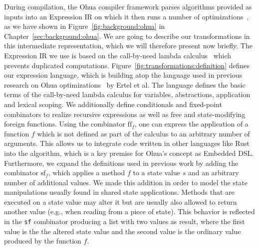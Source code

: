 During compilation, the Ohua compiler framework parses algorithms provided as inputs into an Expression IR on which it then runs a number of optimizations~\cite{ertel2018compiling}, as we have shown in Figure~\ref{fig:background:ohua} in Chapter~\ref{sec:background:ohua}.
We are going to describe our transformations in this intermediate representation, which we will therefore present now briefly.
The Expression IR we use is based on the call-by-need lambda calculus~\cite{ariola1997lambda, ariola1995lambda} which prevents duplicated computations.
Figure~\ref{fig:transformations:definition} defines our expression language, which is building atop the language used in previous research on Ohua optimizations~\cite{ertel2018compiling} by Ertel et al.
The language defines the basic terms of the call-by-need lambda calculus for variables, abstractions, application and lexical scoping.
We additionally define conditionals and fixed-point combinators to realize recursive expressions as well as free and state-modifying foreign functions.
Using the combinator $\text{ff}_f$, one can express the application of a function $f$ which is not defined as part of the calculus to an arbitrary number of arguments.
This allows us to integrate code written in other languages like Rust into the algorithm, which is a key premise for Ohua's concept as Embedded DSL.
Furthermore, we expand the definitions used in previous work by adding the combinator $\text{sf}_f$, which applies a method $f$ to a state value $s$ and an arbitrary number of additional values.
We made this addition in order to model the state manipulations usually found in shared state applications.
Methods that are executed on a state value may alter it but are usually also allowed to return another value (e.g., when reading from a piece of state).
This behavior is reflected in the \texttt{sf} combinator producing a list with two values as result, where the first value is the the altered state value and the second value is the ordinary value produced by the function $f$.

